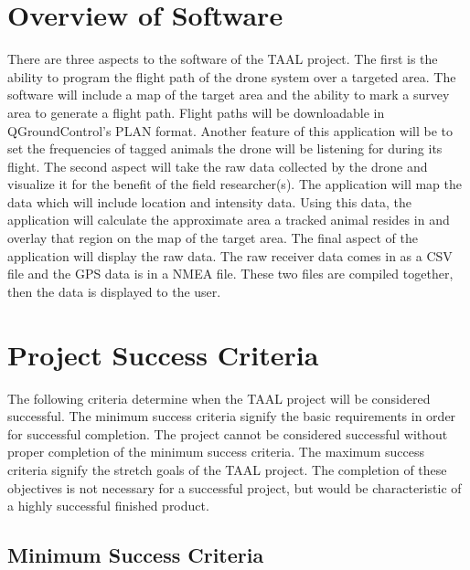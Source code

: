 \documentclass[onecolumn, draftclsnofoot,10pt, compsoc]{IEEEtran}
\begin{document}


\section{Overview of Software}

There are three aspects to the software of the TAAL project. The first is the ability to program the flight path of the drone system over a targeted area. The software will include a map of the target area and the ability to mark a survey area to generate a flight path. Flight paths will be downloadable in QGroundControl's PLAN format. Another feature of this application will be to set the frequencies of tagged animals the drone will be listening for during its flight.
The second aspect will take the raw data collected by the drone and visualize it for the benefit of the field researcher(s). The application will map the data which will include location and intensity data. Using this data, the application will calculate the approximate area a tracked animal resides in and overlay that region on the map of the target area. The final aspect of the application will display the raw data. The raw receiver data comes in as a CSV file and the GPS data is in a NMEA file. These two files are compiled together, then the data is displayed to the user.

\section{Project Success Criteria}
The following criteria determine when the TAAL project will be considered successful. The minimum success criteria signify the basic requirements in order for successful completion. The project cannot be considered successful without proper completion of the minimum success criteria. The maximum success criteria signify the stretch goals of the TAAL project. The completion of these objectives is not necessary for a successful project, but would be characteristic of a highly successful finished product.
    \subsection{Minimum Success Criteria}
\end{document}
